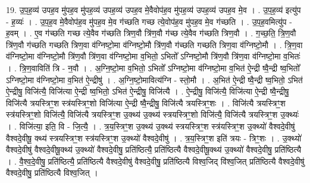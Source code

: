 \documentclass[17pt]{extarticle}
\begin{document}
19. उ॒प॒ह॒व्य॑ उपह॒व मु॑पह॒व मु॑पह॒व्य॑ उपह॒व्य॑ उपह॒व मे॒वैवोप॑ह॒व मु॑पह॒व्य॑ उपह॒व्य॑ उपह॒व मे॒व । . उ॒प॒ह॒व्य॑ इत्यु॑प - ह॒व्यः॑ । . उ॒प॒ह॒व मे॒वैवोप॑ह॒व मु॑पह॒व मे॒व ग॑च्छति गच्छ त्ये॒वोप॑ह॒व मु॑पह॒व मे॒व ग॑च्छति । . उ॒प॒ह॒वमित्यु॑प - ह॒वम् । . ए॒व ग॑च्छति गच्छ त्ये॒वैव ग॑च्छति त्रिण॒वौ त्रि॑ण॒वौ ग॑च्छ त्ये॒वैव ग॑च्छति त्रिण॒वौ । . ग॒च्छ॒ति॒ त्रि॒ण॒वौ त्रि॑ण॒वौ ग॑च्छति गच्छति त्रिण॒वा व॑ग्निष्टो॒मा व॑ग्निष्टो॒मौ त्रि॑ण॒वौ ग॑च्छति गच्छति त्रिण॒वा व॑ग्निष्टो॒मौ । . त्रि॒ण॒वा व॑ग्निष्टो॒मा व॑ग्निष्टो॒मौ त्रि॑ण॒वौ त्रि॑ण॒वा व॑ग्निष्टो॒मा व॒भितो॒ ऽभितो᳚ ऽग्निष्टो॒मौ त्रि॑ण॒वौ त्रि॑ण॒वा व॑ग्निष्टो॒मा व॒भितः॑ । . त्रि॒ण॒वाविति॑ त्रि - न॒वौ । . अ॒ग्नि॒ष्टो॒मा व॒भितो॒ ऽभितो᳚ ऽग्निष्टो॒मा व॑ग्निष्टो॒मा व॒भित॑ ऐ॒न्द्री ष्वै॒न्द्री ष्व॒भितो᳚ ऽग्निष्टो॒मा व॑ग्निष्टो॒मा व॒भित॑ ऐ॒न्द्रीषु॑ । . अ॒ग्नि॒ष्टो॒मावित्य॑ग्नि - स्तो॒मौ । . अ॒भित॑ ऐ॒न्द्री ष्वै॒न्द्री ष्व॒भितो॒ ऽभित॑ ऐ॒न्द्रीषु॒ विजि॑त्यै॒ विजि॑त्या ऐ॒न्द्री ष्व॒भितो॒ ऽभित॑ ऐ॒न्द्रीषु॒ विजि॑त्यै । . ऐ॒न्द्रीषु॒ विजि॑त्यै॒ विजि॑त्या ऐ॒न्द्री ष्वै॒न्द्रीषु॒ विजि॑त्यै त्रयस्त्रिꣳ॒॒श स्त्र॑यस्त्रिꣳ॒॒शो विजि॑त्या ऐ॒न्द्री ष्वै॒न्द्रीषु॒ विजि॑त्यै त्रयस्त्रिꣳ॒॒शः । . विजि॑त्यै त्रयस्त्रिꣳ॒॒श स्त्र॑यस्त्रिꣳ॒॒शो विजि॑त्यै॒ विजि॑त्यै त्रयस्त्रिꣳ॒॒श उ॒क्थ्य॑ उ॒क्थ्य॑ स्त्रयस्त्रिꣳ॒॒शो विजि॑त्यै॒ विजि॑त्यै त्रयस्त्रिꣳ॒॒श उ॒क्थ्यः॑ । . विजि॑त्या॒ इति॒ वि - जि॒त्यै॒ । . त्र॒य॒स्त्रिꣳ॒॒श उ॒क्थ्य॑ उ॒क्थ्य॑ स्त्रयस्त्रिꣳ॒॒श स्त्र॑यस्त्रिꣳ॒॒श उ॒क्थ्यो॑ वैश्वदे॒वीषु॑ वैश्वदे॒वीषू॒ क्थ्य॑ स्त्रयस्त्रिꣳ॒॒श स्त्र॑यस्त्रिꣳ॒॒श उ॒क्थ्यो॑ वैश्वदे॒वीषु॑ । . त्र॒य॒स्त्रिꣳ॒॒श इति॑ त्रयः - त्रिꣳ॒॒शः । . उ॒क्थ्यो॑ वैश्वदे॒वीषु॑ वैश्वदे॒वीषू॒क्थ्य॑ उ॒क्थ्यो॑ वैश्वदे॒वीषु॒ प्रति॑ष्ठित्यै॒ प्रति॑ष्ठित्यै वैश्वदे॒वीषू॒क्थ्य॑ उ॒क्थ्यो॑ वैश्वदे॒वीषु॒ प्रति॑ष्ठित्यै । . वै॒श्व॒दे॒वीषु॒ प्रति॑ष्ठित्यै॒ प्रति॑ष्ठित्यै वैश्वदे॒वीषु॑ वैश्वदे॒वीषु॒ प्रति॑ष्ठित्यै विश्व॒जिद् वि॑श्व॒जित् प्रति॑ष्ठित्यै वैश्वदे॒वीषु॑ वैश्वदे॒वीषु॒ प्रति॑ष्ठित्यै विश्व॒जित् । \newline
\end{document}
